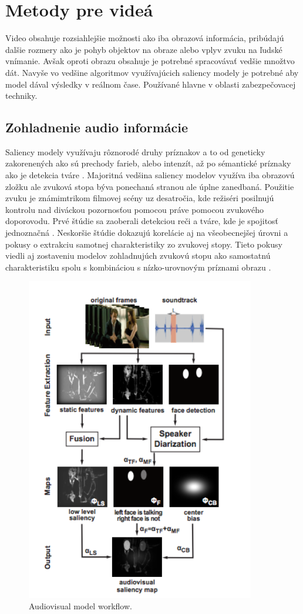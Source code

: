 \section{Metody pre videá}
Video obsahuje rozsiahlejšie možnosti ako iba obrazová informácia, pribúdajú dalšie rozmery ako je pohyb objektov na obraze alebo vplyv zvuku na ľudské vnímanie. Avšak oproti obrazu obsahuje je potrebné spracovávať vedšie množtvo
dát. Navyše vo vedšine algoritmov využívajúcich saliency modely je potrebné aby model dával výsledky v reálnom čase. Používané hlavne v oblasti zabezpečovacej techniky.
\subsection{Zohladnenie audio informácie}
Saliency modely využívaju rôznorodé druhy príznakov a to od geneticky zakorenených ako sú prechody farieb, alebo intenzít, až po sémantické príznaky ako je detekcia tváre \cite{salient-faces}. Majoritná vedšina saliency modelov využíva iba obrazovú zložku ale zvuková stopa býva ponechaná stranou ale úplne zanedbaná. Použitie zvuku je známimtrikom filmovej scény uz desatročia, kde režiséri posilnujú kontrolu nad diváckou pozornosťou pomocou práve pomocou zvukového doporovodu. Prvé štúdie sa zaoberali detekciou reči a tváre, kde je spojitosť jednoznačná \cite{sound-1}. Neskoršie štúdie dokazujú korelácie aj na všeobecnejšej úrovni a pokusy o extrakciu samotnej charakteristiky zo zvukovej stopy\cite{sound-coutrot-1}. Tieto pokusy viedli aj zostaveniu modelov zohladnujúch zvukovú stopu ako samostatnú charakteristiku spolu s kombináciou s nízko-urovnovým príznami obrazu \cite{sound-courot-2}.

\begin{figure}[H]
  \centering
  \includegraphics[width=10cm]{pics/courot-1.png}
  \caption{Audiovisual model workflow.\cite{sound-courot-2}}\label{wrap-fig:4}
\end{figure}
\vspace{10mm}

